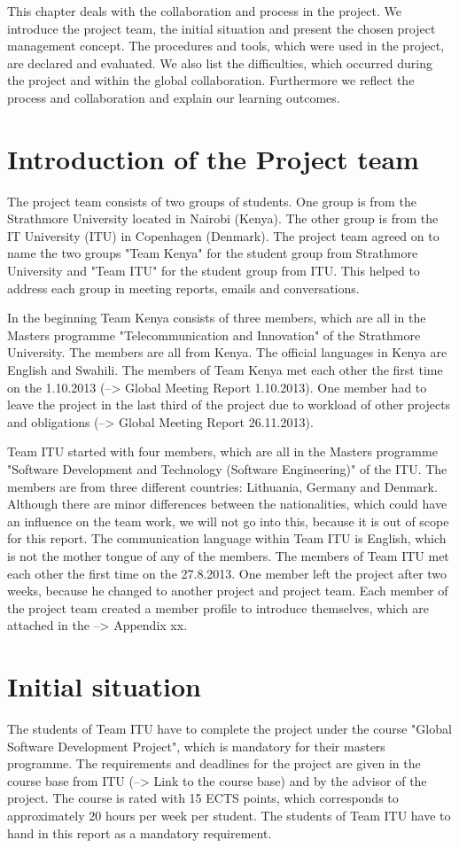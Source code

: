 This chapter deals with the collaboration and process in the project. We introduce the project team, the initial situation and present the chosen project management concept. The procedures and tools, which were used in the project, are declared and evaluated. We also list the difficulties, which occurred during the project and within the global collaboration. Furthermore we reflect the process and collaboration and explain our learning outcomes.


\section{Introduction of the Project team}
The project team consists of two groups of students. One group is from the Strathmore University located in Nairobi (Kenya). The other group is from the IT University (ITU) in Copenhagen (Denmark). The project team agreed on to name the two groups "Team Kenya" for the student group from Strathmore University and "Team ITU" for the student group from ITU. This helped to address each group in meeting reports, emails and conversations.

In the beginning Team Kenya consists of three members, which are all in the Masters programme "Telecommunication and Innovation" of the Strathmore University. The members are all from Kenya. The official languages in Kenya are English and Swahili. The members of Team Kenya met each other the first time on the 1.10.2013 (--> Global Meeting Report 1.10.2013). One member had to leave the project in the last third of the project due to workload of other projects and obligations (--> Global Meeting Report 26.11.2013).

Team ITU started with four members, which are all in the Masters programme "Software Development and Technology (Software Engineering)" of the ITU. The members are from three different countries: Lithuania, Germany and Denmark. Although there are minor differences between the nationalities, which could have an influence on the team work, we will not go into this, because it is out of scope for this report. The communication language within Team ITU is English, which is not the mother tongue of any of the members. The members of Team ITU met each other the first time on the 27.8.2013. One member left the project after two weeks, because he changed to another project and project team.
Each member of the project team created a member profile to introduce themselves, which are attached in the --> Appendix xx.


\section{Initial situation}
The students of Team ITU have to complete the project under the course "Global Software Development Project", which is mandatory for their masters programme. The requirements and deadlines for the project are given in the course base from ITU (--> Link to the course base) and by the advisor of the project. The course is rated with 15 ECTS points, which corresponds to approximately 20 hours per week per student. The students of Team ITU have to hand in this report as a mandatory requirement.

